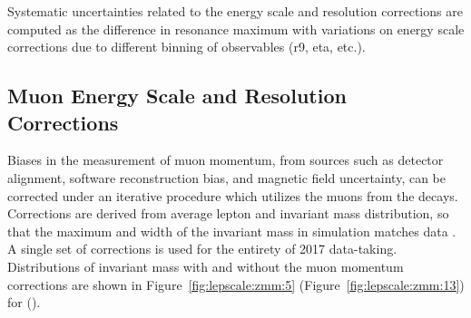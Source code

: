 Systematic uncertainties related to the energy scale and resolution corrections are computed as the difference in \Z resonance maximum with variations on energy scale corrections due to different binning of observables (r9, eta, etc.). 



\subsection{Muon Energy Scale and Resolution Corrections}
Biases in the measurement of muon momentum, from sources such as detector alignment, software reconstruction bias, and magnetic field uncertainty, can be corrected under an iterative procedure which utilizes the muons from the \zmm decays. Corrections are derived from average lepton \pt and \zmm invariant mass distribution, so that the maximum and width of the \zmm invariant mass in simulation matches data
\cite{Bodek:2012id}.  A single set of corrections is used for the entirety of 2017 data-taking. Distributions of \zmm invariant mass with and without the muon momentum corrections are shown in Figure~\ref{fig:lepscale:zmm:5} (Figure~\ref{fig:lepscale:zmm:13}) for \serag (\serah).







